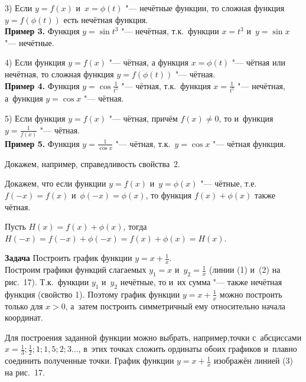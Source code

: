 3) Если $y = f(x)$ и~$x = \phi(t)$ "--- нечётные функции, то сложная функция
$y = f(\phi(t))$ есть нечётная функция.\\
\textbf{Пример 3.} Функция $y = \sin t^{3}$ "--- нечётная, т.к.\ функции
$x = t^{3}$ и~$y = \sin x$ "--- нечётные.

4) Если функция $y = f(x)$ "--- чётная, а функция $x = \phi(t)$ "---
чётная или нечётная, то сложная функция $y = f(\phi(t))$ "--- чётная. \\
\textbf{Пример 4.} Функция $\displaystyle y = \cos \frac{1}{t^{5}}$
"--- чётная, т.к.\ функция $\displaystyle x = \frac{1}{t^{5}}$
"--- нечётная, а~функция $y = \cos x$ "--- чётная.

5) Если функция $y = f(x)$ "--- чётная, причём $f(x) \ne 0$, то
и~функция $y = \frac{1}{f(x)}$ "--- чётная. \\
\textbf{Пример 5.} Функция $\displaystyle y = \frac{1}{\cos x}$
"--- чётная, т.к.\ $y = \cos x$ "--- чётная функция.

Докажем, например, справедливость свойства~2.

Докажем, что если функции $y = f(x)$ и~$y = \phi(x)$ "--- чётные, т.е.\
$f(-x) = f(x)$ и~$\phi(-x) = \phi(x)$, то функция $f(x) + \phi(x)$
также чётная.

Пусть $H(x) = f(x) + \phi(x)$, тогда
$H(-x) = f(-x) + \phi(-x) = f(x) + \phi(x) = H(x)$.

\textbf{Задача}
Построить график функции $\displaystyle y = x + \frac{1}{x}$. \\
Построим графики функций слагаемых $y_{1} = x$ и~$\displaystyle y_{2} = \frac{1}{x}$
(линии (1) и~(2) на рис.\ 17). Т.к.\ функции $y_{1}$ и~$y_{2}$ нечётные,
то и~их сумма "--- также нечётная функция (свойство 1).
Поэтому график функции $\displaystyle y = x + \frac{1}{x}$ можно
построить только для $x > 0$, а~затем построить симметричный ему
относительно начала координат.

Для построения заданной функции можно выбрать, например,точки с~абсциссами
$\displaystyle x = \frac{1}{3}; \frac{1}{2}; 1; 1{,}5; 2; 3 \dots$,
в~этих точках сложить ординаты обоих графиков и~плавно соединить
полученные точки. График функции $\displaystyle y = x + \frac{1}{x}$
изображён линией (3) на рис.\ 17.

